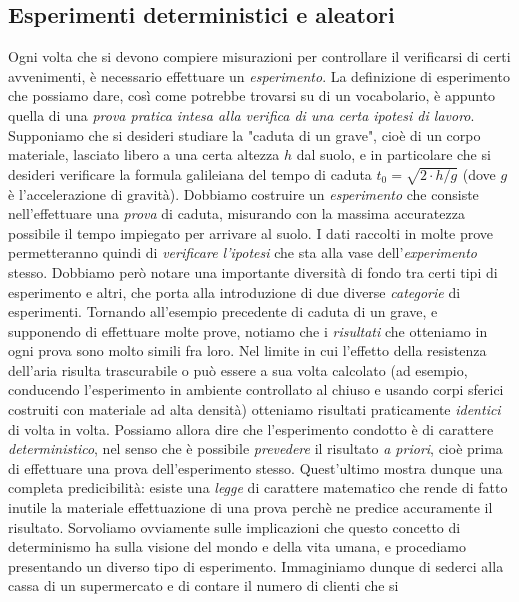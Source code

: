 \documentclass[12pt,oneside,openany]{memoir}
\numberwithin{equation}{subsection}
\begin{document}
\subsection{Esperimenti deterministici e aleatori}
Ogni volta che si devono compiere misurazioni per controllare il verificarsi di
certi avvenimenti, \`e necessario effettuare un \textit{esperimento}. La
definizione di esperimento che possiamo dare, cos\`i come potrebbe trovarsi su
di un vocabolario, \`e appunto quella di una \textit{prova pratica intesa alla
verifica di una certa ipotesi di lavoro}. Supponiamo che si desideri studiare la
"caduta di un grave", cio\`e di un corpo materiale, lasciato libero a una certa
altezza $h$ dal suolo, e in particolare che si desideri verificare la formula
galileiana del tempo di caduta $t_0 = \sqrt{2 \cdot h/g}$ (dove $g$ \`e
l'accelerazione di gravit\`a). Dobbiamo costruire un \textit{esperimento} che
consiste nell'effettuare una \textit{prova} di caduta, misurando con la massima
accuratezza possibile il tempo impiegato per arrivare al suolo. I dati raccolti
in molte prove permetteranno quindi di \textit{verificare l'ipotesi} che sta
alla vase dell'\textit{experimento} stesso. \bigbreak Dobbiamo per\`o notare una
importante diversit\`a di fondo tra certi tipi di esperimento e altri, che porta
alla introduzione di due diverse \textit{categorie} di esperimenti. Tornando
all'esempio precedente di caduta di un grave, e supponendo di effettuare molte
prove, notiamo che i \textit{risultati} che otteniamo in ogni prova sono molto
simili fra loro. Nel limite in cui l'effetto della resistenza dell'aria risulta
trascurabile o pu\`o essere a sua volta calcolato (ad esempio, conducendo
l'esperimento in ambiente controllato al chiuso e usando corpi sferici costruiti
con materiale ad alta densit\`a) otteniamo risultati praticamente
\textit{identici} di volta in volta. Possiamo allora dire che l'esperimento
condotto \`e di carattere \textit{deterministico}, nel senso che \`e possibile
\textit{prevedere} il risultato \textit{a priori}, cio\`e prima di effettuare
una prova dell'esperimento stesso. Quest'ultimo mostra dunque una completa
predicibilit\`a: esiste una \textit{legge} di carattere matematico che rende di
fatto inutile la materiale effettuazione di una prova perch\`e ne predice
accuramente il risultato. \bigbreak Sorvoliamo ovviamente sulle implicazioni che
questo concetto di determinismo ha sulla visione del mondo e della vita umana, e
procediamo presentando un diverso tipo di esperimento. Immaginiamo dunque di
sederci alla cassa di un supermercato e di contare il numero di clienti che si
\end{document}
